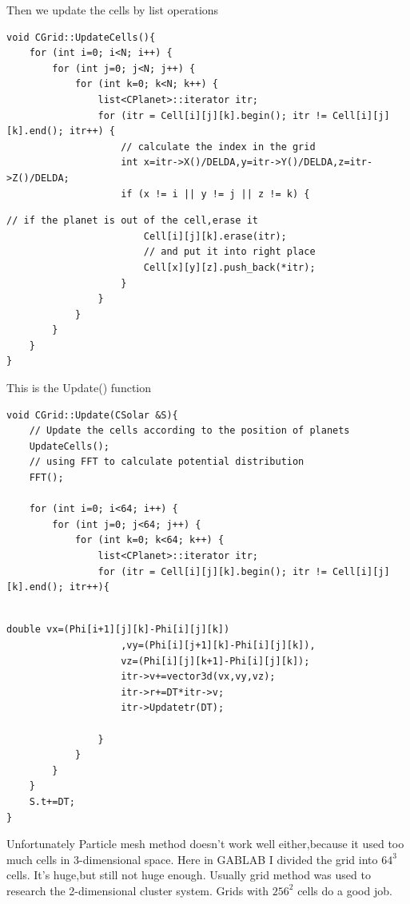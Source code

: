 \documentclass[12pt]{article}
\begin{document}
Then we update the cells by list operations
\begin{lstlisting}[caption=UpdateCells() I]
void CGrid::UpdateCells(){
    for (int i=0; i<N; i++) {
        for (int j=0; j<N; j++) {
            for (int k=0; k<N; k++) {
                list<CPlanet>::iterator itr;
                for (itr = Cell[i][j][k].begin(); itr != Cell[i][j][k].end(); itr++) {
                    // calculate the index in the grid
                    int x=itr->X()/DELDA,y=itr->Y()/DELDA,z=itr->Z()/DELDA;
                    if (x != i || y != j || z != k) {
\end{lstlisting}
\begin{lstlisting}[caption=UpdateCells() II]
                        // if the planet is out of the cell,erase it
                        Cell[i][j][k].erase(itr);
                        // and put it into right place
                        Cell[x][y][z].push_back(*itr);
                    }
                }
            }
        }
    }
}

\end{lstlisting}

This is the Update() function 
\begin{lstlisting}[caption=Update() I]
void CGrid::Update(CSolar &S){
    // Update the cells according to the position of planets
    UpdateCells();
    // using FFT to calculate potential distribution
    FFT();
    
    for (int i=0; i<64; i++) {
        for (int j=0; j<64; j++) {
            for (int k=0; k<64; k++) {
                list<CPlanet>::iterator itr;
                for (itr = Cell[i][j][k].begin(); itr != Cell[i][j][k].end(); itr++){
                   
\end{lstlisting}
\clearpage
\begin{lstlisting}[caption=Update() II]
                    double vx=(Phi[i+1][j][k]-Phi[i][j][k])
                    ,vy=(Phi[i][j+1][k]-Phi[i][j][k]),
                    vz=(Phi[i][j][k+1]-Phi[i][j][k]);
                    itr->v+=vector3d(vx,vy,vz);
                    itr->r+=DT*itr->v;
                    itr->Updatetr(DT);
                
                }
            }
        }
    }
    S.t+=DT;   
}
\end{lstlisting}

Unfortunately Particle mesh method doesn't work well either,because it used too much cells in 3-dimensional space.
Here in GABLAB I divided the grid into $64^3$ cells.
It's huge,but still not huge enough.
Usually grid method was used to research the 2-dimensional cluster system.
Grids with $256^2$ cells do a good job.
\clearpage
\end{document}
